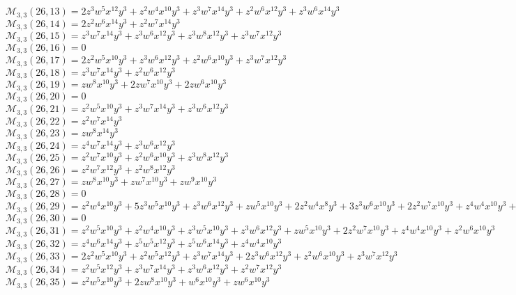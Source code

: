 \documentclass[12pt]{memoireuqam1.3}
\begin{document}
$\mathcal{M}_{3,3}(26,13)=2z^3w^5x^{12}y^3+z^2w^4x^{10}y^3+z^3w^7x^{14}y^3+z^2w^6x^{12}y^3+z^3w^6x^{14}y^3$\\
$\mathcal{M}_{3,3}(26,14)=2z^2w^6x^{14}y^3+z^2w^7x^{14}y^3$\\
$\mathcal{M}_{3,3}(26,15)=z^3w^7x^{14}y^3+z^3w^6x^{12}y^3+z^3w^8x^{12}y^3+z^3w^7x^{12}y^3$\\
$\mathcal{M}_{3,3}(26,16)=0$\\
$\mathcal{M}_{3,3}(26,17)=2z^2w^5x^{10}y^3+z^3w^6x^{12}y^3+z^2w^6x^{10}y^3+z^3w^7x^{12}y^3$\\
$\mathcal{M}_{3,3}(26,18)=z^3w^7x^{14}y^3+z^2w^6x^{12}y^3$\\
$\mathcal{M}_{3,3}(26,19)=zw^8x^{10}y^3+2zw^7x^{10}y^3+2zw^6x^{10}y^3$\\
$\mathcal{M}_{3,3}(26,20)=0$\\
$\mathcal{M}_{3,3}(26,21)=z^2w^5x^{10}y^3+z^3w^7x^{14}y^3+z^3w^6x^{12}y^3$\\
$\mathcal{M}_{3,3}(26,22)=z^2w^7x^{14}y^3$\\
$\mathcal{M}_{3,3}(26,23)=zw^8x^{14}y^3$\\
$\mathcal{M}_{3,3}(26,24)=z^4w^7x^{14}y^3+z^3w^6x^{12}y^3$\\
$\mathcal{M}_{3,3}(26,25)=z^2w^7x^{10}y^3+z^2w^6x^{10}y^3+z^3w^8x^{12}y^3$\\
$\mathcal{M}_{3,3}(26,26)=z^2w^7x^{12}y^3+z^2w^8x^{12}y^3$\\
$\mathcal{M}_{3,3}(26,27)=zw^8x^{10}y^3+zw^7x^{10}y^3+zw^9x^{10}y^3$\\
$\mathcal{M}_{3,3}(26,28)=0$\\
$\mathcal{M}_{3,3}(26,29)=z^2w^4x^{10}y^3+5z^3w^5x^{10}y^3+z^3w^6x^{12}y^3+zw^5x^{10}y^3+2z^2w^4x^8y^3+3z^3w^6x^{10}y^3+2z^2w^7x^{10}y^3+z^4w^4x^{10}y^3+z^2w^5x^8y^3$\\
$\mathcal{M}_{3,3}(26,30)=0$\\
$\mathcal{M}_{3,3}(26,31)=z^2w^5x^{10}y^3+z^2w^4x^{10}y^3+z^3w^5x^{10}y^3+z^3w^6x^{12}y^3+zw^5x^{10}y^3+2z^2w^7x^{10}y^3+z^4w^4x^{10}y^3+z^2w^6x^{10}y^3$\\
$\mathcal{M}_{3,3}(26,32)=z^4w^6x^{14}y^3+z^5w^5x^{12}y^3+z^5w^6x^{14}y^3+z^4w^4x^{10}y^3$\\
$\mathcal{M}_{3,3}(26,33)=2z^2w^5x^{10}y^3+z^2w^5x^{12}y^3+z^3w^7x^{14}y^3+2z^3w^6x^{12}y^3+z^2w^6x^{10}y^3+z^3w^7x^{12}y^3$\\
$\mathcal{M}_{3,3}(26,34)=z^2w^5x^{12}y^3+z^3w^7x^{14}y^3+z^3w^6x^{12}y^3+z^2w^7x^{12}y^3$\\
$\mathcal{M}_{3,3}(26,35)=z^2w^5x^{10}y^3+2zw^8x^{10}y^3+w^6x^{10}y^3+zw^6x^{10}y^3$\\
\end{document}

